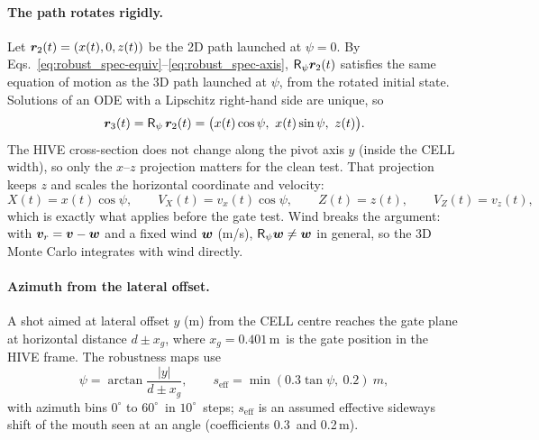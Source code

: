 \paragraph{The path rotates rigidly.}
Let $\bm{r}_2(t)=(x(t),0,z(t))$ be the 2D path launched at $\psi=0$.
By Eqs.~\eqref{eq:robust_spec-equiv}--\eqref{eq:robust_spec-axis}, $\mathsf R_\psi\bm{r}_2(t)$ satisfies the same
equation of motion as the 3D path launched at $\psi$, from the rotated initial state.
Solutions of an ODE with a Lipschitz right-hand side are unique, so
\begin{equation}
  \vect r_3(t) = \mathsf R_\psi\,\vect r_2(t) = \big(x(t)\cos\psi,\ x(t)\sin\psi,\ z(t)\big).
  \label{eq:robust_spec-proj}
\end{equation}
The HIVE cross-section does not change along the pivot axis $y$ (inside the CELL width), so only the
$x$--$z$ projection matters for the clean test.
That projection keeps $z$ and scales the horizontal coordinate and velocity:
\begin{equation}
  X(t) = x(t)\cos\psi,\qquad V_X(t) = v_x(t)\cos\psi,\qquad Z(t)=z(t),\qquad V_Z(t)=v_z(t),
  \label{eq:robust_spec-projX}
\end{equation}
which is exactly what  applies before the gate test.
Wind breaks the argument: with $\bm{v}_r = \bm{v}-\bm{w}$ and a fixed wind $\bm{w}$ (\unit{m/s}),
$\mathsf R_\psi\bm{w}\ne\bm{w}$ in general, so the 3D Monte Carlo integrates with wind directly.

\paragraph{Azimuth from the lateral offset.}
A shot aimed at lateral offset $y$ (\unit{m}) from the CELL centre reaches the gate plane at
horizontal distance $d\pm x_g$, where $x_g=0.401$\,\unit{m}\derived\ is the gate position in the HIVE
frame.
The robustness maps use
\begin{equation}
  \psi = \arctan\frac{|y|}{d\pm x_g},\qquad
  s_{\mathrm{eff}} = \min(0.3\tan\psi,\ 0.2)\ \unit{m},
  \label{eq:robust_spec-psi}
\end{equation}
with azimuth bins $0^\circ$ to $60^\circ$\assumed\ in $10^\circ$\assumed\ steps; $s_{\mathrm{eff}}$ is an
assumed effective sideways shift of the mouth seen at an angle (coefficients 0.3\assumed\ and
0.2\,\unit{m}\assumed).

